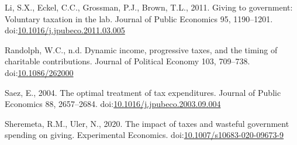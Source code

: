 \documentclass[ review  , 3p ]{elsarticle}
\begin{document}
  \leavevmode\hypertarget{ref-Li2011}{}%
  Li, S.X., Eckel, C.C., Grossman, P.J., Brown, T.L., 2011. Giving to government: Voluntary taxation in the lab. Journal of Public Economics 95, 1190--1201. doi:\href{https://doi.org/10.1016/j.jpubeco.2011.03.005}{10.1016/j.jpubeco.2011.03.005}
  
  \leavevmode\hypertarget{ref-Randolph1995}{}%
  Randolph, W.C., n.d. Dynamic income, progressive taxes, and the timing of charitable contributions. Journal of Political Economy 103, 709--738. doi:\href{https://doi.org/10.1086/262000}{10.1086/262000}
  
  \leavevmode\hypertarget{ref-Saez2004}{}%
  Saez, E., 2004. The optimal treatment of tax expenditures. Journal of Public Economics 88, 2657--2684. doi:\href{https://doi.org/10.1016/j.jpubeco.2003.09.004}{10.1016/j.jpubeco.2003.09.004}
  
  \leavevmode\hypertarget{ref-Sheremeta2020}{}%
  Sheremeta, R.M., Uler, N., 2020. The impact of taxes and wasteful government spending on giving. Experimental Economics. doi:\href{https://doi.org/10.1007/s10683-020-09673-9}{10.1007/s10683-020-09673-9}
\end{document}
